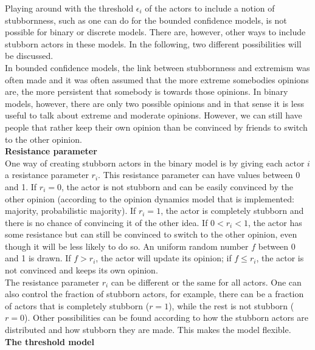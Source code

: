 \documentclass[11 pt , letterpaper , twoside , openright]{book}
\begin{document}
Playing around with the threshold $\epsilon_i$ of the actors to include a notion of stubbornness, such as one can do for the bounded confidence models, is not possible for binary or discrete models. There are, however, other ways to include stubborn actors in these models. In the following, two different possibilities will be discussed. \\
\newline
In bounded confidence models, the link between stubbornness and extremism was often made and it was often assumed that the more extreme somebodies opinions are, the more persistent that somebody is towards those opinions. In binary models, however, there are only two possible opinions and in that sense it is less useful to talk about extreme and moderate opinions. However, we can still have people that rather keep their own opinion than be convinced by friends to switch to the other opinion.\\
\newline
\textbf{Resistance parameter}\\
\newline
One way of creating stubborn actors in the binary model is by giving each actor $i$ a resistance parameter $r_i$. This resistance parameter can have values between 0 and 1. If $r_i = 0$, the actor is not stubborn and can be easily convinced by the other opinion (according to the opinion dynamics model that is implemented: majority, probabilistic majority). If $r_i = 1$, the actor is completely stubborn and there is no chance of convincing it of the other idea. If $0 < r_i < 1$, the actor has some resistance but can still be convinced to switch to the other opinion, even though it will be less likely to do so. An uniform random number $f$ between 0 and 1 is drawn. If $f > r_i$, the actor will update its opinion; if $f \leqslant r_i$, the actor is not convinced and keeps its own opinion.\\
\newline
The resistance parameter $r_i$ can be different or the same for all actors. One can also control the fraction of stubborn actors, for example, there can be a fraction of actors that is completely stubborn ($r = 1$), while the rest is not stubborn ($r = 0$). Other possibilities can be found according to how the stubborn actors are distributed and how stubborn they are made. This makes the model flexible.\\
\newline
\textbf{The threshold model}\\
\newline
\end{document}
